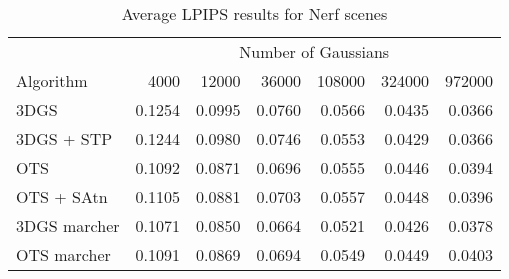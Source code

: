 \begin{table}[h!]
\centering
\caption{Average LPIPS results for Nerf scenes}
\label{tab:lpips_avg_others}
\begin{tabular}{lrrrrrr}
\toprule
& \multicolumn{6}{c}{Number of Gaussians} \\
Algorithm & 4000 & 12000 & 36000 & 108000 & 324000 & 972000 \\

\midrule
3DGS & 0.1254 & 0.0995 & 0.0760 & 0.0566 & 0.0435 & 0.0366 \\
3DGS + STP & 0.1244 & 0.0980 & 0.0746 & 0.0553 & 0.0429 & 0.0366 \\
OTS & 0.1092 & 0.0871 & 0.0696 & 0.0555 & 0.0446 & 0.0394 \\
OTS + SAtn & 0.1105 & 0.0881 & 0.0703 & 0.0557 & 0.0448 & 0.0396 \\
3DGS marcher & 0.1071 & 0.0850 & 0.0664 & 0.0521 & 0.0426 & 0.0378 \\
OTS marcher & 0.1091 & 0.0869 & 0.0694 & 0.0549 & 0.0449 & 0.0403 \\
\bottomrule
\end{tabular}
\end{table}
